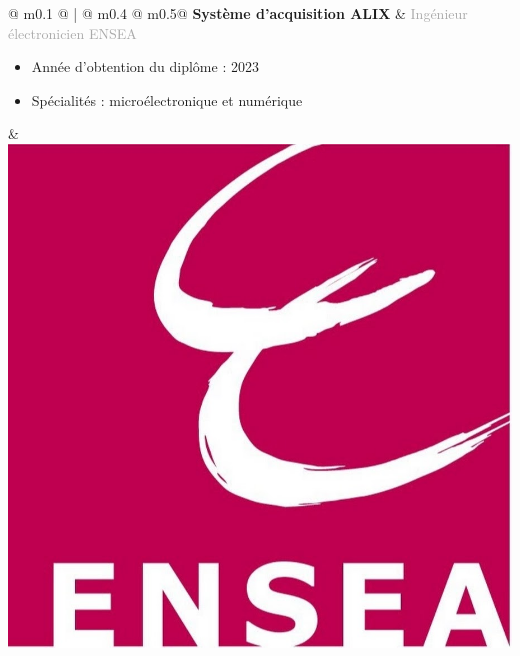 \documentclass{article}
\begin{document}
\newpage
\thispagestyle{pro_experiences}



\begin{tabular}{@{\hspace{0.05\textwidth}} m{0.1\textwidth} @ {\hspace{0.05\textwidth}} ! {\color{secondaryBlue}\vline width 2pt \hspace{0.04\textwidth}} @ {}m{0.4\textwidth} @{\hspace{0.15\textwidth}} m{0.5\linewidth}@{}}
    \textcolor{secondaryBlue}{\textbf{Système d'acquisition ALIX}} & 
    \textcolor{darkGray}{Ingénieur électronicien ENSEA}
    \begin{itemize}[label={\textcolor{gray!80}{\checkmark}}, topsep=0pt, partopsep=0pt, itemsep=0.5pt, parsep=2pt, after=\vspace*{-\baselineskip}]
        \item \textcolor{gray!80}{Année d'obtention du diplôme : 2023} 
        \item \textcolor{gray!80}{Spécialités : microélectronique et numérique} 
    \end{itemize} &
    \includegraphics[width=0.1\linewidth]{ensea.jpg}
\end{tabular}
\end{document}
